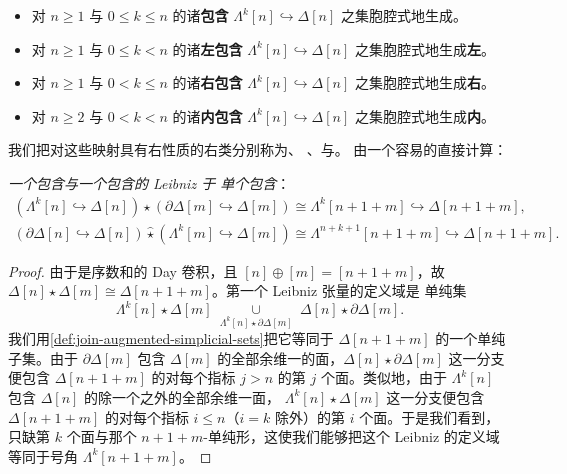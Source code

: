 \begin{definition}[（左／右／内）\trAnodyneExtension]\label{def:anodyne-extensions}
\begin{itemize}
\item 对 $n\ge 1$ 与 $0\le k\le n$ 的诸\textbf{\trHorn{}包含}%
$\Lambda^{k}[n]\hookrightarrow\Delta[n]$ 之集胞腔式地生成\textbf{\trAnodyneExtension}。
\item 对 $n\ge 1$ 与 $0\le k<n$ 的诸\textbf{左\trHorn{}包含}%
$\Lambda^{k}[n]\hookrightarrow\Delta[n]$ 之集胞腔式地生成\textbf{左\trAnodyneExtension}。
\item 对 $n\ge 1$ 与 $0<k\le n$ 的诸\textbf{右\trHorn{}包含}%
$\Lambda^{k}[n]\hookrightarrow\Delta[n]$ 之集胞腔式地生成\textbf{右\trAnodyneExtension}。
\item 对 $n\ge 2$ 与 $0<k<n$ 的诸\textbf{内\trHorn{}包含}%
$\Lambda^{k}[n]\hookrightarrow\Delta[n]$ 之集胞腔式地生成\textbf{内\trAnodyneExtension}。
\end{itemize}
\end{definition}

我们把对这些映射具有右\trLifting{}性质的右类分别称为\textbf{\trKanFibration}、%
\textbf{\trLeftFibration}、\textbf{\trRightFibration}与\textbf{\trInnerFibration}。
由一个容易的直接计算：

\begin{lemma}\label{lem:leibniz-join-horn-boundary}
\emph{一个\trHorn{}包含与一个\trBoundary{}包含的 Leibniz \trJoin\trIsomorphism{}于%
单个\trHorn{}包含}：
\begin{gather*}
(\Lambda^{k}[n]\hookrightarrow\Delta[n])\mathbin{\hat{\star}}
(\partial\Delta[m]\hookrightarrow\Delta[m])
\cong
\Lambda^{k}[n+1+m]\hookrightarrow\Delta[n+1+m]\mbox{,}\\
(\partial\Delta[n]\hookrightarrow\Delta[n])\mathbin{\hat{\star}}
(\Lambda^{k}[m]\hookrightarrow\Delta[m])
\cong
\Lambda^{n+k+1}[n+1+m]\hookrightarrow\Delta[n+1+m]\mbox{.}
\end{gather*}
\end{lemma}

\begin{proof}
由于\trJoin\trBifunctor{}是序数和的 Day 卷积，且 $[n]\oplus[m]=[n+1+m]$，故%
$\Delta[n]\star\Delta[m]\cong\Delta[n+1+m]$。第一个 Leibniz 张量的定义域是%
单纯集
\begin{equation*}
\Lambda^{k}[n]\star\Delta[m]
\;\underset{\Lambda^{k}[n]\star\partial\Delta[m]}{\cup}\;
\Delta[n]\star\partial\Delta[m]\mbox{.}
\end{equation*}
我们用\cref{def:join-augmented-simplicial-sets}把它等同于%
$\Delta[n+1+m]$ 的一个单纯子集。由于 $\partial\Delta[m]$ 包含 $\Delta[m]$%
的全部余维一的面，$\Delta[n]\star\partial\Delta[m]$ 这一分支便包含%
$\Delta[n+1+m]$ 的对每个指标 $j>n$ 的第 $j$ 个面。类似地，由于%
$\Lambda^{k}[n]$ 包含 $\Delta[n]$ 的除一个之外的全部余维一面，%
$\Lambda^{k}[n]\star\Delta[m]$ 这一分支便包含 $\Delta[n+1+m]$ 的对每个指标%
$i\le n$（$i=k$ 除外）的第 $i$ 个面。于是我们看到，只缺第 $k$ 个面与那个%
$n+1+m$-单纯形，这使我们能够把这个 Leibniz \trJoin{}的定义域等同于号角%
$\Lambda^{k}[n+1+m]$。
\end{proof}

